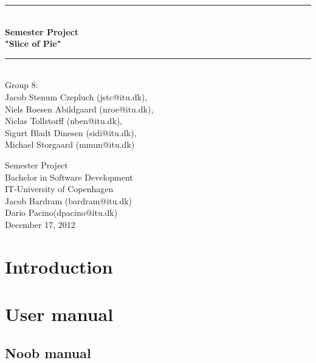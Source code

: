 \documentclass[a4paper,11pt]{article}
\begin{document}
\begin{titlepage}
\centering \parindent=0pt
\newcommand{\HRule}{\rule{\textwidth}{1mm}}
 \HRule\\[1cm]\Huge\bfseries
Semester Project\\"Slice of Pie"\\[0.7cm]
\HRule\\[4cm]  \large Group 8:
\\Jacob Stenum Czepluch (jstc@itu.dk), \\Niels Roesen Abildgaard (nroe@itu.dk), \\Niclas Tollstorff (nben@itu.dk), \\Sigurt Bladt Dinesen (sidi@itu.dk), \\Michael Storgaard (mmun@itu.dk)\\
 \normalsize %
\begin{flushleft}
Semester Project\\
Bachelor in Software Development\\
IT-University of Copenhagen\\
Jacob Bardram (bardram@itu.dk)\\
Dario Pacino(dpacino@itu.dk) \\
December 17, 2012 \end{flushleft}
\end{titlepage}

\tableofcontents
\pagebreak

\pagebreak
\section{Introduction}


\pagebreak
\section{User manual}


\pagebreak
\subsection{Noob manual}
\label{sec:User manual}

\end{document}
